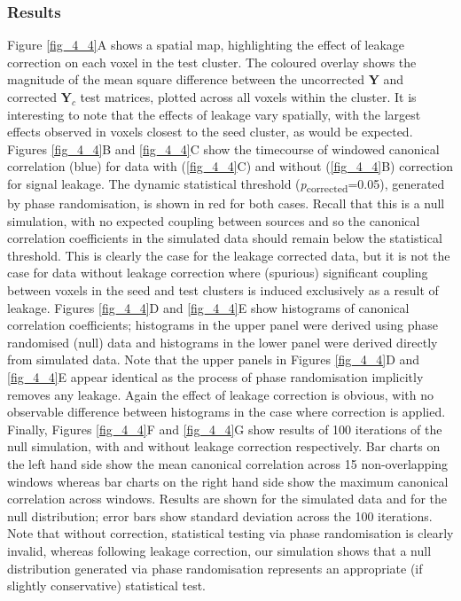 \subsubsection{Results}
Figure \ref{fig_4_4}A shows a spatial map, highlighting the effect of leakage correction on each voxel in the test cluster. The coloured overlay shows the magnitude of the mean square difference between the uncorrected \textbf{Y} and corrected $\mathbf{Y}_c$ test matrices, plotted across all voxels within the cluster. It is interesting to note that the effects of leakage vary spatially, with the largest effects observed in voxels closest to the seed cluster, as would be expected. Figures \ref{fig_4_4}B and \ref{fig_4_4}C show the timecourse of windowed canonical correlation (blue) for data with (\ref{fig_4_4}C) and without (\ref{fig_4_4}B) correction for signal leakage. The dynamic statistical threshold (\textit{p}\textsubscript{corrected}=0.05), generated by phase randomisation, is shown in red for both cases. Recall that this is a null simulation, with no expected coupling between sources and so the canonical correlation coefficients in the simulated data should remain below the statistical threshold. This is clearly the case for the leakage corrected data, but it is not the case for data without leakage correction where (spurious) significant coupling between voxels in the seed and test clusters is induced exclusively as a result of leakage. Figures \ref{fig_4_4}D and \ref{fig_4_4}E show histograms of canonical correlation coefficients; histograms in the upper panel were derived using phase randomised (null) data and histograms in the lower panel were derived directly from simulated data. Note that the upper panels in Figures \ref{fig_4_4}D and \ref{fig_4_4}E appear identical as the process of phase randomisation implicitly removes any leakage. Again the effect of leakage correction is obvious, with no observable difference between histograms in the case where correction is applied. Finally, Figures \ref{fig_4_4}F and \ref{fig_4_4}G show results of 100 iterations of the null simulation, with and without leakage correction respectively. Bar charts on the left hand side show the mean canonical correlation across 15 non-overlapping windows whereas bar charts on the right hand side show the maximum canonical correlation across windows. Results are shown for the simulated data and for the null distribution; error bars show standard deviation across the 100 iterations. Note that without correction, statistical testing via phase randomisation is clearly invalid, whereas following leakage correction, our simulation shows that a null distribution generated via phase randomisation represents an appropriate (if slightly conservative) statistical test.

